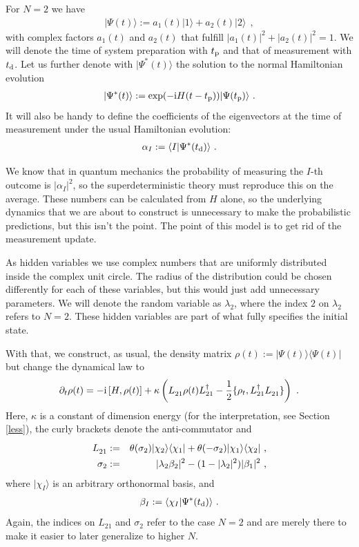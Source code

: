 \documentclass[11pt,twoside,A4]{article}
\def\beqn{\begin{eqnarray}}
\def\eeqn{\end{eqnarray}}
\begin{document}
For $N =2$ we have
\beqn
|\Psi (t) \rangle := a_1(t) | 1 \rangle + a_2 (t) | 2 \rangle ~~,
\eeqn
with complex factors $a_1(t)$ and $a_2(t)$ that fulfill $ |a_1(t)|^2 + |a_2(t)|^2 = 1$. We will denote the time of
system preparation with $t_{\rm p}$ and that of measurement with $t_{\rm d}$. %
Let us further denote with $|\Psi ^* (t) \rangle$ the solution to the normal Hamiltonian evolution
\beqn
|\Psi^* (t) \rangle := \exp ( - {\rm i}  H (t -t_{\rm p}) ) |\Psi (t_{\rm p}) \rangle ~.
\eeqn
It will also be handy to define the coefficients of the eigenvectors at the time of measurement under the
usual Hamiltonian evolution:
\beqn 
\alpha_I := \langle I | \Psi^* (t_{\rm d}) \rangle~.
\eeqn

We know that in quantum mechanics the probability of measuring the $I$-th outcome is $|\alpha_I |^2$, so the
superdeterministic theory must reproduce this on the average. These numbers can be calculated from $ H$
alone, so the underlying dynamics that we are about to construct is unnecessary to make the probabilistic predictions, but this isn't the point. The point of this model is to get rid of the measurement update. 


As hidden variables we use complex numbers that are
uniformly distributed inside the complex unit circle. The radius of the distribution could be chosen differently for each of these variables, but this would just add
unnecessary parameters. We will denote the random variable as $\lambda_2$, where the
index $2$ on $\lambda_2$ refers to $N=2$. These hidden variables are part of what fully specifies the initial state. 

With that, we construct, as usual, the density matrix $\rho(t) := |\Psi(t) \rangle \langle \Psi(t) |$ but change the dynamical law to 
\beqn
\partial_t \rho(t) = - {\rm i} \left[  H, \rho(t) \right] +  \kappa \left( L^{\textcolor{white}{\dag}}_{21} \rho(t) L_{21}^\dag - \frac{1}{2} \{ 
\rho_t, L^\dag_{21} L_{21}^{\textcolor{white}{\dag}} \} \right)~. \label{dyn}
\eeqn
Here, $\kappa$ is a constant of dimension energy (for the interpretation, see Section \ref{less}), the curly brackets denote the anti-commutator and
\beqn
L^{\textcolor{white}{\dag}}_{21} &:=& \theta(\sigma_2)  |\chi_2 \rangle \langle \chi_1| + \theta(-\sigma_2)  |\chi_1 \rangle \langle \chi_2| ~, \\
\sigma_2 &:=&  |  \lambda_2 \beta_2 |^2 - (1 -  | \lambda_2|^2) |\beta_1|^2 ~,
\eeqn
where $| \chi_I \rangle$ is an arbitrary orthonormal basis, and 
\beqn 
\beta_I := \langle \chi_I | \Psi^* (t_{\rm d}) \rangle~.
\eeqn
Again, the indices on $L_{21}$ and $\sigma_2$ refer to the case $N=2$ and are merely there to make it easier to later
generalize to higher $N$. 
\end{document}
